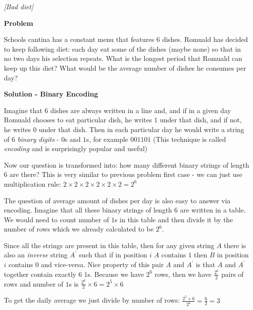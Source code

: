 \begin{problem}
\textit{[Bad diet]}

\textbf{Problem}

Schools cantina has a constant menu that features $6$ dishes. Romuald has decided to keep following diet: each day eat some of the dishes (maybe none) so that in no two days his selection repeats.
What is the longest period that Romuald can keep up this diet? What would be the average number of dishes he consumes per day?

\textbf{Solution - Binary Encoding}

Imagine that $6$ dishes are always written in a line and, and if in a given day Romuald chooses to eat particular dish, he writes $1$ under that dish, and if not, he writes $0$ under that dish. Then in each particular day he would write a string of $6$ \textit{binary digits} - $0$s and $1$s, for example $001101$ (This technique is called \textit{encoding} and is surprisingly popular and useful)

Now our question is transformed into: how many different binary strings of length $6$ are there? This is very similar to previous problem first case - we can just use multiplication rule: $2\times2\times2\times2\times2\times2 = 2^6$

The question of average amount of dishes per day is also easy to answer via encoding. Imagine that all these binary strings of length $6$ are written in a table. We would need to count number of $1$s in this table and then divide it by the number of rows which we already calculated to be $2^6$.

Since all the strings are present in this table, then for any given string $A$ there is also an \textit{inverse} string $A^\prime$ such that if in position $i$ $A$ contains $1$ then $B$ in position $i$ contains $0$ and vice-versa. 
Nice property of this pair $A$ and $A^\prime$ is that $A$ and $A^\prime$ together contain exactly $6$ $1$s. Because we have $2^6$ rows, then we have $\frac{2^6}{2}$ pairs of rows and number of $1$s is $\frac{2^6}{2}\times 6=2^5\times6$

To get the daily average we just divide by number of rows: $\frac{2^5\times6}{2^6}=\frac{6}{2}=3$
\end{problem}
%
\filbreak
